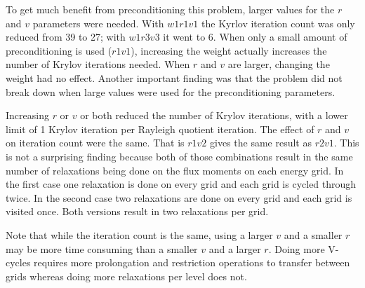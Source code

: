 To get much benefit from preconditioning this problem, larger values for the $r$ and $v$ parameters were needed. With $w1r1v1$ the Kyrlov iteration count was only reduced from 39 to 27; with $w1r3v3$ it went to 6. When only a small amount of preconditioning is used ($r1v1$), increasing the weight actually increases the number of Krylov iterations needed. When $r$ and $v$ are larger, changing the weight had no effect. Another important finding was that the problem did not break down when large values were used for the preconditioning parameters. 

Increasing $r$ or $v$ or both reduced the number of Krylov iterations, with a lower limit of 1 Krylov iteration per Rayleigh quotient iteration. The effect of $r$ and $v$ on iteration count were the same. That is $r1v2$ gives the same result as $r2v1$. This is not a surprising finding because both of those combinations result in the same number of relaxations being done on the flux moments on each energy grid. In the first case one relaxation is done on every grid and each grid is cycled through twice. In the second case two relaxations are done on every grid and each grid is visited once. Both versions result in two relaxations per grid. 

Note that while the iteration count is the same, using a larger $v$ and a smaller $r$ may be more time consuming than a smaller $v$ and a larger $r$. Doing more V-cycles requires more prolongation and restriction operations to transfer between grids whereas doing more relaxations per level does not. 

